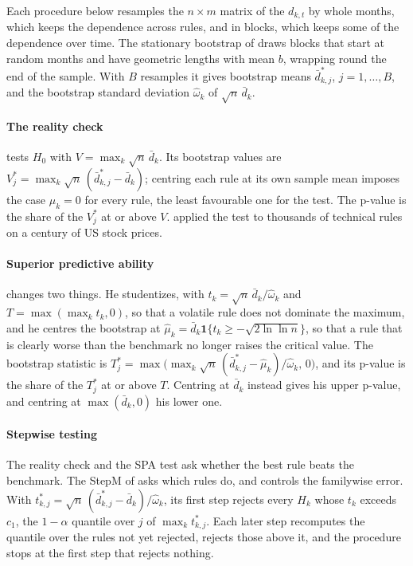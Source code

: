 \begin{chapterrefs}
Each procedure below resamples the $n\times m$ matrix of the $d_{k,t}$ by whole months, which keeps the
dependence across rules, and in blocks, which keeps some of the dependence over time. The stationary
bootstrap of \textcite{politis1994} draws blocks that start at random months and have geometric lengths with mean $b$,
wrapping round the end of the sample. With $B$ resamples it gives bootstrap means $\bar d^{*}_{k,j}$,
$j=1,\dots,B$, and the bootstrap standard deviation $\hat\omega_k$ of $\sqrt n\,\bar d_k$.

\paragraph{The reality check}
\textcite{white2000} tests $H_0$ with $V=\max_k\sqrt n\,\bar d_k$. Its bootstrap values are
$V^{*}_j=\max_k\sqrt n\,(\bar d^{*}_{k,j}-\bar d_k)$; centring each rule at its own sample mean imposes the
case $\mu_k=0$ for every rule, the least favourable one for the test. The p-value is the share of the
$V^{*}_j$ at or above $V$. \textcite{sullivan1999} applied the test to thousands of technical rules on a century of
US stock prices.

\paragraph{Superior predictive ability}
\textcite{hansen2005} changes two things. He studentizes, with $t_k=\sqrt n\,\bar d_k/\hat\omega_k$ and
$T=\max(\max_kt_k,0)$, so that a volatile rule does not dominate the maximum, and he centres the bootstrap
at $\hat\mu_k=\bar d_k\mathbf 1\{t_k\ge-\sqrt{2\ln\ln n}\}$, so that a rule that is clearly worse than the
benchmark no longer raises the critical value. The bootstrap statistic is
$T^{*}_j=\max\bigl(\max_k\sqrt n\,(\bar d^{*}_{k,j}-\hat\mu_k)/\hat\omega_k,\,0\bigr)$, and its p-value is the share of
the $T^{*}_j$ at or above $T$. Centring at $\bar d_k$ instead gives his upper p-value, and centring at
$\max(\bar d_k,0)$ his lower one.

\paragraph{Stepwise testing}
The reality check and the SPA test ask whether the best rule beats the benchmark. The StepM of
\textcite{romano2005} asks which rules do, and controls the familywise error. With
$t^{*}_{k,j}=\sqrt n\,(\bar d^{*}_{k,j}-\bar d_k)/\hat\omega_k$, its first step rejects every $H_k$ whose $t_k$
exceeds $c_1$, the $1-\alpha$ quantile over $j$ of $\max_kt^{*}_{k,j}$. Each later step recomputes the
quantile over the rules not yet rejected, rejects those above it, and the procedure stops at the first
step that rejects nothing.


\end{chapterrefs}
